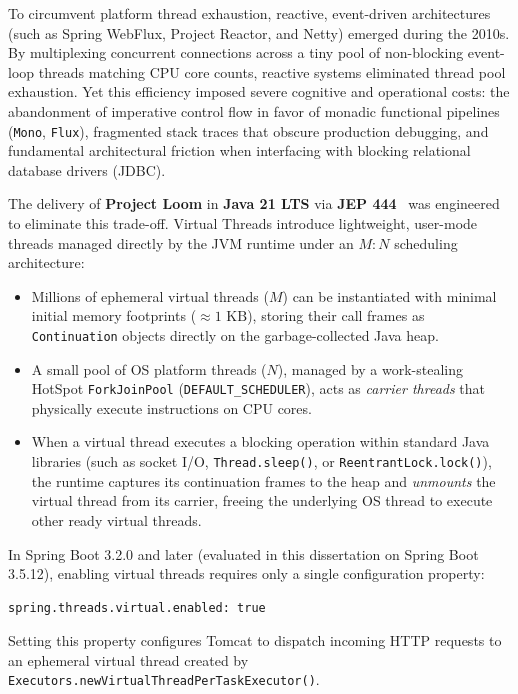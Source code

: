 To circumvent platform thread exhaustion, reactive, event-driven architectures (such as Spring WebFlux, Project Reactor, and Netty) emerged during the 2010s. By multiplexing concurrent connections across a tiny pool of non-blocking event-loop threads matching CPU core counts, reactive systems eliminated thread pool exhaustion. Yet this efficiency imposed severe cognitive and operational costs: the abandonment of imperative control flow in favor of monadic functional pipelines (\texttt{Mono}, \texttt{Flux}), fragmented stack traces that obscure production debugging, and fundamental architectural friction when interfacing with blocking relational database drivers (JDBC).

The delivery of \textbf{Project Loom} in \textbf{Java 21 LTS} via \textbf{JEP 444}~\cite{JEP444} was engineered to eliminate this trade-off. Virtual Threads introduce lightweight, user-mode threads managed directly by the JVM runtime under an $M:N$ scheduling architecture:
\begin{itemize}
  \item Millions of ephemeral virtual threads ($M$) can be instantiated with minimal initial memory footprints ($\approx 1\text{ KB}$), storing their call frames as \texttt{Continuation} objects directly on the garbage-collected Java heap.
  \item A small pool of OS platform threads ($N$), managed by a work-stealing HotSpot \texttt{ForkJoinPool} (\texttt{DEFAULT\_SCHEDULER}), acts as \emph{carrier threads} that physically execute instructions on CPU cores.
  \item When a virtual thread executes a blocking operation within standard Java libraries (such as socket I/O, \texttt{Thread.sleep()}, or \texttt{ReentrantLock.lock()}), the runtime captures its continuation frames to the heap and \emph{unmounts} the virtual thread from its carrier, freeing the underlying OS thread to execute other ready virtual threads.
\end{itemize}

In Spring Boot 3.2.0 and later (evaluated in this dissertation on Spring Boot 3.5.12), enabling virtual threads requires only a single configuration property:
\begin{verbatim}
spring.threads.virtual.enabled: true
\end{verbatim}
Setting this property configures Tomcat to dispatch incoming HTTP requests to an ephemeral virtual thread created by \texttt{Executors.\allowbreak newVirtualThread\allowbreak PerTaskExecutor()}.

